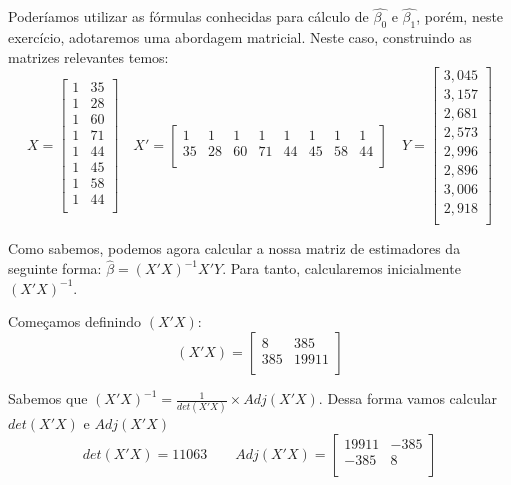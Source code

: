 \documentclass[]{ufpe-exercises}
\begin{document}
\begin{questions}
\begin{parts}
\begin{solution}
			Poderíamos utilizar as fórmulas conhecidas para cálculo de \(\hat{\beta_{0}}\) e \(\hat{\beta_{1}}\), porém, neste exercício, adotaremos uma abordagem matricial. Neste caso, construindo as matrizes relevantes temos:
			\[ X =
				\begin{bmatrix}
					1 & 35 \\
					1 & 28 \\
					1 & 60 \\
					1 & 71 \\
					1 & 44 \\
					1 & 45 \\
					1 & 58 \\
					1 & 44 \\
				\end{bmatrix} \quad
				X' =
				\begin{bmatrix}
					1  & 1  & 1  & 1  & 1  & 1  & 1  & 1  \\
					35 & 28 & 60 & 71 & 44 & 45 & 58 & 44 \\
				\end{bmatrix} \quad
				Y =
				\begin{bmatrix}
					3,045 \\
					3,157 \\
					2,681 \\
					2,573 \\
					2,996 \\
					2,896 \\
					3,006 \\
					2,918 \\
				\end{bmatrix}
			\]

			Como sabemos, podemos agora calcular a nossa matriz de estimadores da seguinte forma: \(\hat{\beta} = (X'X)^{-1}X'Y\). Para tanto, calcularemos inicialmente \((X'X)^{-1}\).

			Começamos definindo \((X'X)\):
			\[
				(X'X) =
				\begin{bmatrix}
					8   & 385   \\
					385 & 19911 \\
				\end{bmatrix}
			\]

			Sabemos que \((X'X)^{-1} = \frac{1}{det(X'X)} \times Adj(X'X)\). Dessa forma vamos calcular \(det(X'X)\) e \(Adj(X'X)\)
			\[ det(X'X) = 11063 \qquad
				Adj(X'X) =
				\begin{bmatrix}
					19911 & -385 \\
					-385  & 8    \\
				\end{bmatrix}
			\]


\end{solution}
\end{parts}
\end{questions}
\end{document}
